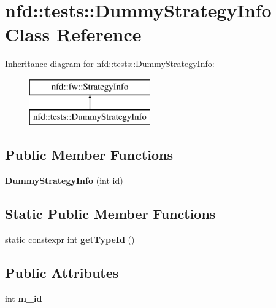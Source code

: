 \hypertarget{classnfd_1_1tests_1_1DummyStrategyInfo}{}\section{nfd\+:\+:tests\+:\+:Dummy\+Strategy\+Info Class Reference}
\label{classnfd_1_1tests_1_1DummyStrategyInfo}
Inheritance diagram for nfd\+:\+:tests\+:\+:Dummy\+Strategy\+Info\+:\begin{figure}[H]
\begin{center}
\leavevmode
\includegraphics[height=2.000000cm]{classnfd_1_1tests_1_1DummyStrategyInfo}
\end{center}
\end{figure}
\subsection*{Public Member Functions}
\begin{DoxyCompactItemize}
\item 
{\bfseries Dummy\+Strategy\+Info} (int id)\hypertarget{classnfd_1_1tests_1_1DummyStrategyInfo_ab0bd8f6908b88929127b65ade357fb80}{}\label{classnfd_1_1tests_1_1DummyStrategyInfo_ab0bd8f6908b88929127b65ade357fb80}

\end{DoxyCompactItemize}
\subsection*{Static Public Member Functions}
\begin{DoxyCompactItemize}
\item 
static constexpr int {\bfseries get\+Type\+Id} ()\hypertarget{classnfd_1_1tests_1_1DummyStrategyInfo_afd7e2f6b6ddd80fa573547b671d755d8}{}\label{classnfd_1_1tests_1_1DummyStrategyInfo_afd7e2f6b6ddd80fa573547b671d755d8}

\end{DoxyCompactItemize}
\subsection*{Public Attributes}
\begin{DoxyCompactItemize}
\item 
int {\bfseries m\+\_\+id}\hypertarget{classnfd_1_1tests_1_1DummyStrategyInfo_a7e36f3134944a1bab54ef3083d058ca3}{}\label{classnfd_1_1tests_1_1DummyStrategyInfo_a7e36f3134944a1bab54ef3083d058ca3}

\end{DoxyCompactItemize}


